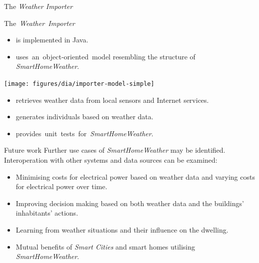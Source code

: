 \documentclass[final,hyperref={pdfpagelabels=true}]{beamer}
\begin{document}
\begin{frame}[fragile]
\begin{columns}[t]
\begin{column}{.45\textwidth}
      \begin{block}{The \emph{Weather Importer}}
        \begin{minipage}{\dimexpr.49\textwidth}
	  \mbox{The \emph{Weather Importer}}

	  \hspace{-.84em}\begin{minipage}{\dimexpr\textwidth+.84em}
	    \vspace{.4em}
	    \begin{itemize}
	      \item is implemented in Java.
	      \item \mbox{uses an object-oriented model} resembling the structure of \emph{SmartHomeWeather}.
	    \end{itemize}
	  \end{minipage}
	\end{minipage}
	\begin{minipage}{\dimexpr.41\textwidth}
	  \centering
  	  \texttt{[image: figures/dia/importer-model-simple]}
	\end{minipage}

	\vspace{.3em}
	
	\begin{itemize}
	  \item retrieves weather data from local sensors and Internet services.
	  \item generates individuals based on weather data.
	  \item \mbox{provides unit tests for \emph{SmartHomeWeather}.}
	\end{itemize}
      \end{block}

      \begin{block}{Future work}
	Further use cases of \emph{SmartHomeWeather} may be identified. Interoperation with other systems and data sources can be examined:
          \begin{itemize}
            \item Minimising costs for electrical power based on weather data and varying costs for electrical power over time.
	    \item Improving decision making based on both weather data and the buildings' inhabitants' actions.
	    \item Learning from weather situations and their influence on the dwelling.
	    \item Mutual benefits of \emph{Smart Cities} and smart homes utilising \emph{SmartHomeWeather}.
	  \end{itemize}


\end{block}
\end{column}
\end{columns}
\end{frame}
\end{document}
